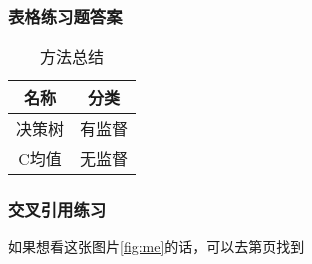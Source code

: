 \documentclass[UTF8]{ctexbook}
\begin{document}
\subsubsection{表格练习题答案}
\begin{table}[htbp]
	\centering
	\caption[table1]{方法总结}
	\begin{tabular}{cc}
		\toprule[1.5pt]
		名称 &分类\\
		\midrule[1pt]
		决策树 &有监督\\
		C均值 &无监督\\
		\bottomrule[1.5pt]
	\end{tabular}
\end{table}


\subsubsection{交叉引用练习}
如果想看这张图片\ref{fig:me}的话，可以去第\pageref{fig:me}页找到		
\end{document}
